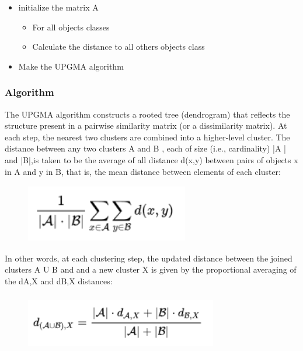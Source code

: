 \documentclass[12pt]{report}
\begin{document}
\begin{itemize}
\item initialize the matrix A
\begin{itemize}
\item For all objects classes
\end{itemize}
\begin{itemize}
\item Calculate the distance to all others objects class
\end{itemize}
\item Make the UPGMA algorithm
\end{itemize}

\subsubsection*{Algorithm}

The UPGMA algorithm constructs a rooted tree (dendrogram) that reflects the structure present in a pairwise similarity matrix (or a dissimilarity matrix). At each step, the nearest two clusters are combined into a higher-level cluster. The distance between any two clusters A and B , each of size (i.e., cardinality) |A | and |B|,is taken to be the average of all distance d(x,y) between pairs of objects x in A and y in B, that is, the mean distance between elements of each cluster:
 
 
\begin{figure}[H]
	\begin{center}		\includegraphics[width=2.8in,height=1.0in]{./media/image19.png}
	\end{center}\end{figure}
 
 
In other words, at each clustering step, the updated distance between the joined clusters A U B and and a new cluster X is given by the proportional averaging of the dA,X and dB,X distances:
 
 
\begin{figure}[H]
	\begin{center}		\includegraphics[width=3.3in,height=1.0in]{./media/image20.png}
	\end{center}\end{figure}
 
\end{document}
